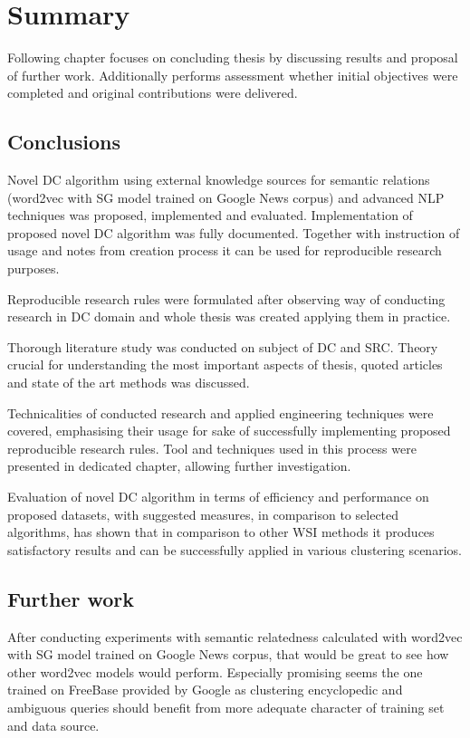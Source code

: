 \documentclass[a4paper, 12pt, oneside]{Thesis} %
\begin{document}
\chapter{Summary} Following chapter focuses on concluding thesis by discussing results and proposal of further work. Additionally performs assessment whether initial objectives were completed and original contributions were delivered.

\section{Conclusions} Novel DC algorithm using external knowledge sources for semantic relations (word2vec with SG model trained on Google News corpus) and advanced NLP techniques was proposed, implemented and evaluated. Implementation of proposed novel DC algorithm was fully documented. Together with instruction of usage and notes from creation process it can be used for reproducible research purposes.

Reproducible research rules were formulated after observing way of conducting research in DC domain and whole thesis was created applying them in practice.

Thorough literature study was conducted on subject of DC and SRC. Theory crucial for understanding the most important aspects of thesis, quoted articles and state of the art methods was discussed.

Technicalities of conducted research and applied engineering techniques were covered, emphasising their usage for sake of successfully implementing proposed reproducible research rules. Tool and techniques used in this process were presented in dedicated chapter, allowing further investigation.

Evaluation of novel DC algorithm in terms of efficiency and performance on proposed datasets, with suggested measures, in comparison to selected algorithms, has shown that in comparison to other WSI methods it produces satisfactory results and can be successfully applied in various clustering scenarios.

\section{Further work} After conducting experiments with semantic relatedness calculated with word2vec with SG model trained on Google News corpus, that would be great to see how other word2vec models would perform. Especially promising seems the one trained on FreeBase provided by Google as clustering encyclopedic and ambiguous queries should benefit from more adequate character of training set and data source.
\end{document}
